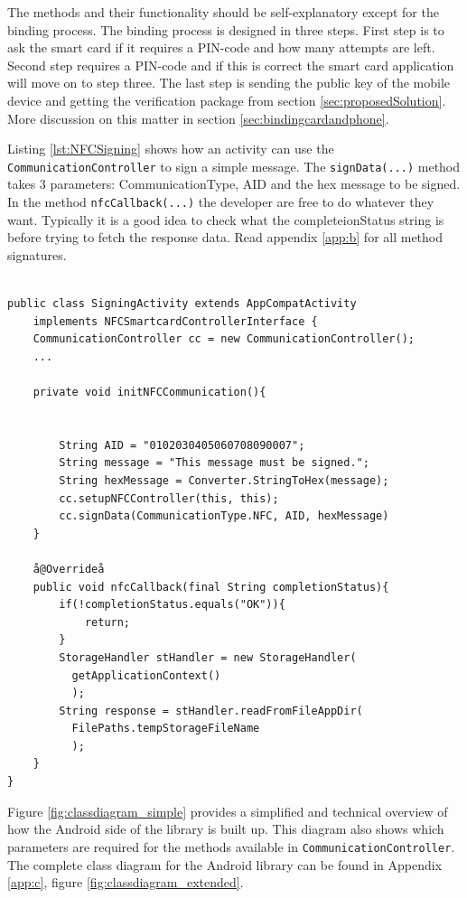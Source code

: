 The methods and their functionality should be self-explanatory except for the binding process. The binding process is designed in three steps. First step is to ask the smart card if it requires a PIN-code and how many attempts are left. Second step requires a PIN-code and if this is correct the smart card application will move on to step three. The last step is sending the public key of the mobile device and getting the verification package from section \ref{sec:proposedSolution}. More discussion on this matter in section \ref{sec:bindingcardandphone}.

Listing \ref{lst:NFCSigning} shows how an activity can use the \texttt{CommunicationController} to sign a simple message. The \texttt{signData(...)} method takes 3 parameters: CommunicationType, AID and the hex message to be signed. In the method \texttt{nfcCallback(...)} the developer are free to do whatever they want. Typically it is a good idea to check what the completeionStatus string is before trying to fetch the response data. Read appendix \ref{app:b} for all method signatures.

\begin{lstlisting}[caption=Java code example showing how to send sign a message using a NFC smart card., label=lst:NFCSigning,escapechar=å]

public class SigningActivity extends AppCompatActivity
    implements NFCSmartcardControllerInterface {
    CommunicationController cc = new CommunicationController();
    ...

    private void initNFCCommunication(){


        String AID = "0102030405060708090007";
        String message = "This message must be signed.";
        String hexMessage = Converter.StringToHex(message);
        cc.setupNFCController(this, this);
        cc.signData(CommunicationType.NFC, AID, hexMessage)
    }

    å@Overrideå
    public void nfcCallback(final String completionStatus){
        if(!completionStatus.equals("OK")){
            return;
        }
        StorageHandler stHandler = new StorageHandler(
          getApplicationContext()
          );
        String response = stHandler.readFromFileAppDir(
          FilePaths.tempStorageFileName
          );
    }
}

\end{lstlisting}


Figure \ref{fig:classdiagram_simple} provides a simplified and technical overview of how the Android side of the library is built up. This diagram also shows which parameters are required for the methods available in \texttt{CommunicationController}. The complete class diagram for the Android library can be found in Appendix \ref{app:c}, figure \ref{fig:classdiagram_extended}.


